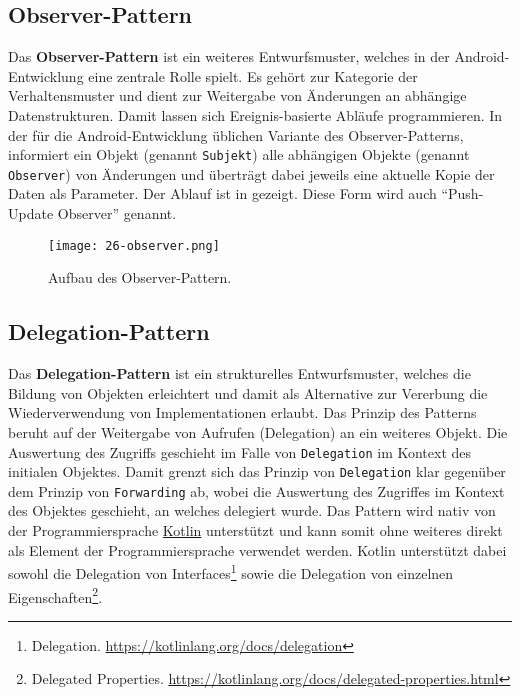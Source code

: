 \newpage

\subsection{Observer-Pattern}\label{sub:observer}

Das \textbf{Observer-Pattern} ist ein weiteres Entwurfsmuster, welches in der Android-Entwicklung eine zentrale Rolle spielt. Es gehört zur Kategorie der Verhaltensmuster und dient zur Weitergabe von Änderungen an abhängige Datenstrukturen. Damit lassen sich Ereignis-basierte Abläufe programmieren. In der für die Android-Entwicklung üblichen Variante des Observer-Patterns, informiert ein Objekt (genannt \texttt{Subjekt}) alle  abhängigen Objekte (genannt \texttt{Observer}) von Änderungen und überträgt dabei jeweils eine aktuelle Kopie der Daten als Parameter. Der Ablauf ist in  gezeigt. Diese Form wird auch \enquote{Push-Update Observer} genannt. 

\begin{figure}[H]
    \texttt{[image: 26-observer.png]}
    \caption{Aufbau des Observer-Pattern.}\label{fig:observer}
\end{figure}

\subsection{Delegation-Pattern}\label{subsec:delegation}

Das \textbf{Delegation-Pattern} ist ein strukturelles Entwurfsmuster, welches die Bildung von Objekten erleichtert und damit als Alternative zur Vererbung die Wiederverwendung von Implementationen erlaubt. Das Prinzip des Patterns beruht auf der Weitergabe von Aufrufen (Delegation) an ein weiteres Objekt. Die Auswertung des Zugriffs geschieht im Falle von \texttt{Delegation} im Kontext des initialen Objektes. Damit grenzt sich das Prinzip von \texttt{Delegation} klar gegenüber dem Prinzip von \texttt{Forwarding} ab, wobei die Auswertung des Zugriffes im Kontext des Objektes geschieht, an welches delegiert wurde. Das Pattern wird nativ von der Programmiersprache \hyperref[sec:kotlin]{Kotlin} unterstützt und kann somit ohne weiteres direkt als Element der Programmiersprache verwendet werden. Kotlin unterstützt dabei sowohl die Delegation von Interfaces\footnote{Delegation. \url{https://kotlinlang.org/docs/delegation}} sowie die Delegation von einzelnen Eigenschaften\footnote{Delegated Properties. \url{https://kotlinlang.org/docs/delegated-properties.html}}.

